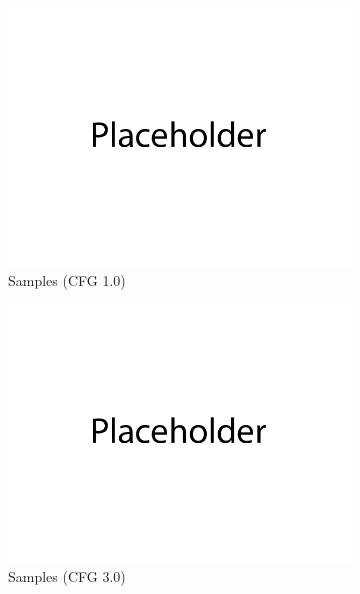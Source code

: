 \documentclass{article}
\begin{document}
\newpage
{}
\begin{figure}[H]
    \centering
    \begin{subfigure}{0.45\textwidth}
        \centering
        \includegraphics[width=\textwidth]{figures/q3_c_samples_cfg1.0.png}
        \caption{Samples (CFG 1.0)}
    \end{subfigure}
    \begin{subfigure}{0.45\textwidth}
        \centering
        \includegraphics[width=\textwidth]{figures/q3_c_samples_cfg3.0.png}
        \caption{Samples (CFG 3.0)}
    \end{subfigure}
    \\
    \begin{subfigure}{0.45\textwidth}

\end{subfigure}
\end{figure}
\end{document}
